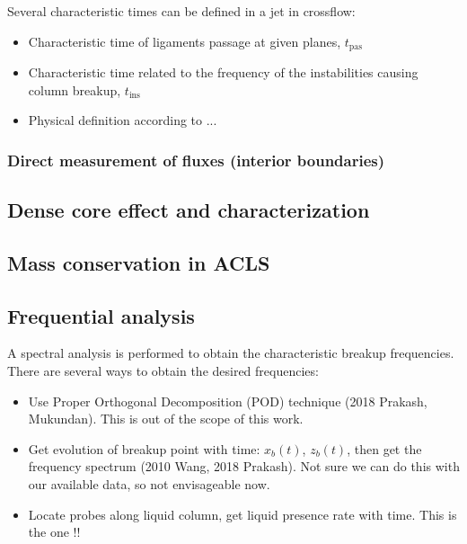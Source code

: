 Several characteristic times can be defined in a jet in crossflow:

\begin{itemize}

	\item Characteristic time of ligaments passage at given planes, $t_\mathrm{pas}$
	
	\item Characteristic time related to the frequency of the instabilities causing column breakup, $t_\mathrm{ins}$
	
	\item Physical definition according to ...

\end{itemize}

\subsubsection{Direct measurement of fluxes (interior boundaries)}
\label{subsubsec:ch5_interior_boundaries}

\subsection{Dense core effect and characterization}
\label{subsec:ch5_dense_core_in_ACLS_simus}

\subsection{Mass conservation in ACLS}

\subsection{Frequential analysis}

A spectral analysis is performed to obtain the characteristic breakup frequencies. There are several ways to obtain the desired frequencies:

\begin{itemize}

	\item Use Proper Orthogonal Decomposition (POD) technique (2018 Prakash, Mukundan). This is out of the scope of this work.
	
	\item Get evolution of breakup point with time: $x_b \left( t \right)$, $z_b \left( t \right)$, then get the frequency spectrum  (2010 Wang, 2018 Prakash). Not sure we can do this with our available data, so not envisageable now.
	
	\item Locate probes along liquid column, get liquid presence rate with time. This is the one !!

\end{itemize}

